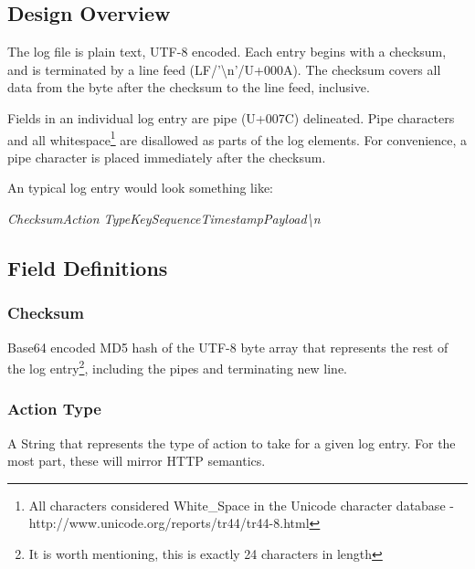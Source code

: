 \subsection{Design Overview}

The log file is plain text, UTF-8 encoded.  Each entry begins with a checksum, and is terminated by a line feed (LF/'\textbackslash n'/U+000A). The checksum covers all data from the byte after the checksum to the line feed, inclusive.

Fields in an individual log entry are pipe (U+007C) delineated. Pipe characters and all whitespace\footnote{All characters considered White\_Space in the Unicode character database - http://www.unicode.org/reports/tr44/tr44-8.html} are disallowed as parts of the log elements.  For convenience, a pipe character is placed immediately after the checksum.

An typical log entry would look something like:
\begin{center}
\em Checksum\textbar Action Type\textbar Key\textbar Sequence\textbar Timestamp\textbar Payload\textbackslash n
\end{center}


\subsection{Field Definitions}

\subsubsection{Checksum}
Base64 encoded MD5 hash of the UTF-8 byte array that represents the rest of the log entry\footnote{It is worth mentioning, this is exactly 24 characters in length}, including the pipes and terminating new line.

\subsubsection{Action Type}
A String that represents the type of action to take for a given log entry.  For the most part, these will mirror HTTP semantics.

